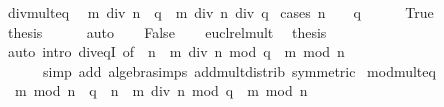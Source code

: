 \begin{isabellebody}
\isamarkupfalse%
%
\endisatagproof
{\isafoldproof}%
%
\isadelimproof
\isanewline
%
\endisadelimproof
\isanewline
{}\isamarkupfalse%
\ div{\isacharunderscore}{\kern0pt}mult{}{\isacharunderscore}{\kern0pt}eq{\isacharcolon}{\kern0pt}\isanewline
\ \ {\isachardoublequoteopen}m\ div\ {\isacharparenleft}{\kern0pt}n\ {\isacharasterisk}{\kern0pt}\ q{\isacharparenright}{\kern0pt}\ {\isacharequal}{\kern0pt}\ {\isacharparenleft}{\kern0pt}m\ div\ n{\isacharparenright}{\kern0pt}\ div\ q{\isachardoublequoteclose}\isanewline
%
\isadelimproof
%
\endisadelimproof
%
\isatagproof
{}\isamarkupfalse%
\ {\isacharparenleft}{\kern0pt}cases\ {\isachardoublequoteopen}n\ {\isacharequal}{\kern0pt}\ {}\ {\isasymor}\ q\ {\isacharequal}{\kern0pt}\ {}{\isachardoublequoteclose}{\isacharparenright}{\kern0pt}\isanewline
\ \ \isamarkupfalse%
\ True\isanewline
\ \ \isamarkupfalse%
\ \isamarkupfalse%
\ {\isacharquery}{\kern0pt}thesis\isanewline
\ \ \ \ \isamarkupfalse%
\ auto\isanewline
{}\isamarkupfalse%
\isanewline
\ \ \isamarkupfalse%
\ False\isanewline
\ \ \isamarkupfalse%
\ eucl{\isacharunderscore}{\kern0pt}rel{\isacharunderscore}{\kern0pt}mult{}\ \isamarkupfalse%
\ {\isacharquery}{\kern0pt}thesis\isanewline
\ \ \ \ \isamarkupfalse%
\ {\isacharparenleft}{\kern0pt}auto\ intro{\isacharcolon}{\kern0pt}\ div{\isacharunderscore}{\kern0pt}eqI\ {\isacharbrackleft}{\kern0pt}of\ {\isacharunderscore}{\kern0pt}\ {\isachardoublequoteopen}n\ {\isacharasterisk}{\kern0pt}\ {\isacharparenleft}{\kern0pt}m\ div\ n\ mod\ q{\isacharparenright}{\kern0pt}\ {\isacharplus}{\kern0pt}\ m\ mod\ n{\isachardoublequoteclose}{\isacharbrackright}{\kern0pt}\isanewline
\ \ \ \ \ \ simp\ add{\isacharcolon}{\kern0pt}\ algebra{\isacharunderscore}{\kern0pt}simps\ add{\isacharunderscore}{\kern0pt}mult{\isacharunderscore}{\kern0pt}distrib{}\ {\isacharbrackleft}{\kern0pt}symmetric{\isacharbrackright}{\kern0pt}{\isacharparenright}{\kern0pt}\isanewline
{}\isamarkupfalse%
%
\endisatagproof
{\isafoldproof}%
%
\isadelimproof
\isanewline
%
\endisadelimproof
\isanewline
{}\isamarkupfalse%
\ mod{\isacharunderscore}{\kern0pt}mult{}{\isacharunderscore}{\kern0pt}eq{\isacharcolon}{\kern0pt}\isanewline
\ \ {\isachardoublequoteopen}m\ mod\ {\isacharparenleft}{\kern0pt}n\ {\isacharasterisk}{\kern0pt}\ q{\isacharparenright}{\kern0pt}\ {\isacharequal}{\kern0pt}\ n\ {\isacharasterisk}{\kern0pt}\ {\isacharparenleft}{\kern0pt}m\ div\ n\ mod\ q{\isacharparenright}{\kern0pt}\ {\isacharplus}{\kern0pt}\ m\ mod\ n{\isachardoublequoteclose}\isanewline

\end{isabellebody}
